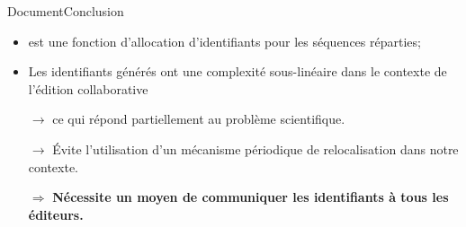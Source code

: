 







\begin{frame}{Document}{Conclusion}

  \begin{itemize}
  \item \LSEQ est une fonction d'allocation d'identifiants pour les séquences
    réparties;
  \item Les identifiants générés ont une complexité sous-linéaire dans le contexte
    de l'édition collaborative
  \item [$\rightarrow$] ce qui répond partiellement au problème scientifique.
  \item [$\rightarrow$] Évite l'utilisation d'un mécanisme périodique de
    relocalisation dans notre contexte.
  \end{itemize}


  \vspace{1cm}
  
  \large
  \begin{itemize}
  \item [$\Rightarrow$] \textbf{Nécessite un moyen de communiquer les
      identifiants à tous les éditeurs.}
  \end{itemize}
  
\end{frame}



